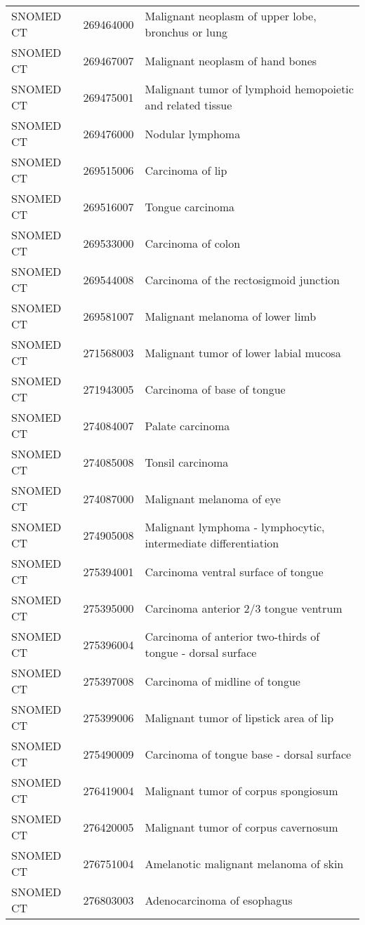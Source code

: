 \begin{longtable}{p{}p{}p{}}
  SNOMED CT & 269464000 & Malignant neoplasm of upper lobe, bronchus or lung \\ 
  SNOMED CT & 269467007 & Malignant neoplasm of hand bones \\ 
  SNOMED CT & 269475001 & Malignant tumor of lymphoid hemopoietic and related tissue \\ 
  SNOMED CT & 269476000 & Nodular lymphoma \\ 
  SNOMED CT & 269515006 & Carcinoma of lip \\ 
  SNOMED CT & 269516007 & Tongue carcinoma \\ 
  SNOMED CT & 269533000 & Carcinoma of colon \\ 
  SNOMED CT & 269544008 & Carcinoma of the rectosigmoid junction \\ 
  SNOMED CT & 269581007 & Malignant melanoma of lower limb \\ 
  SNOMED CT & 271568003 & Malignant tumor of lower labial mucosa \\ 
  SNOMED CT & 271943005 & Carcinoma of base of tongue \\ 
  SNOMED CT & 274084007 & Palate carcinoma \\ 
  SNOMED CT & 274085008 & Tonsil carcinoma \\ 
  SNOMED CT & 274087000 & Malignant melanoma of eye \\ 
  SNOMED CT & 274905008 & Malignant lymphoma - lymphocytic, intermediate differentiation \\ 
  SNOMED CT & 275394001 & Carcinoma ventral surface of tongue \\ 
  SNOMED CT & 275395000 & Carcinoma anterior 2/3 tongue ventrum \\ 
  SNOMED CT & 275396004 & Carcinoma of anterior two-thirds of tongue - dorsal surface \\ 
  SNOMED CT & 275397008 & Carcinoma of midline of tongue \\ 
  SNOMED CT & 275399006 & Malignant tumor of lipstick area of lip \\ 
  SNOMED CT & 275490009 & Carcinoma of tongue base - dorsal surface \\ 
  SNOMED CT & 276419004 & Malignant tumor of corpus spongiosum \\ 
  SNOMED CT & 276420005 & Malignant tumor of corpus cavernosum \\ 
  SNOMED CT & 276751004 & Amelanotic malignant melanoma of skin \\ 
  SNOMED CT & 276803003 & Adenocarcinoma of esophagus \\ 

\end{longtable}
